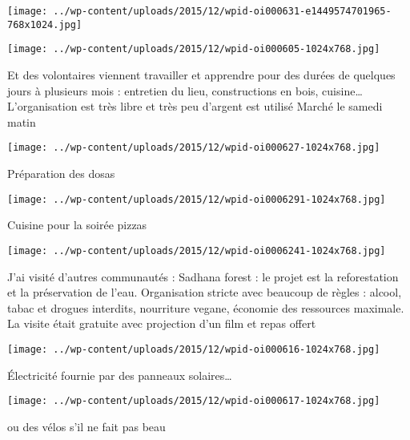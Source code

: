  \newline
\centerline{\texttt{[image: ../wp-content/uploads/2015/12/wpid-oi000631-e1449574701965-768x1024.jpg]} } 
 \newline
 \newline
\centerline{\texttt{[image: ../wp-content/uploads/2015/12/wpid-oi000605-1024x768.jpg]} } 
 \newline
 Et des volontaires viennent travailler et apprendre pour des durées de quelques jours à plusieurs mois : entretien du lieu, constructions en bois, cuisine… L'organisation est très libre et très peu d'argent est utilisé \newline
 Marché le samedi matin \newline
 \newline
\centerline{\texttt{[image: ../wp-content/uploads/2015/12/wpid-oi000627-1024x768.jpg]} } 
 \newline
 Préparation des dosas \newline
 \newline
\centerline{\texttt{[image: ../wp-content/uploads/2015/12/wpid-oi0006291-1024x768.jpg]} } 
 \newline
 Cuisine pour la soirée pizzas \newline
 \newline
\centerline{\texttt{[image: ../wp-content/uploads/2015/12/wpid-oi0006241-1024x768.jpg]} } 
 \newline
 J'ai visité d'autres communautés : \newline
 Sadhana forest : le projet est la reforestation et la préservation de l'eau. Organisation stricte avec beaucoup de règles : alcool, tabac et drogues interdits, nourriture vegane, économie des ressources maximale. La visite était gratuite avec projection d'un film et repas offert \newline
 \newline
\centerline{\texttt{[image: ../wp-content/uploads/2015/12/wpid-oi000616-1024x768.jpg]} } 
 \newline
 Électricité fournie par des panneaux solaires… \newline
 \newline
\centerline{\texttt{[image: ../wp-content/uploads/2015/12/wpid-oi000617-1024x768.jpg]} } 
 \newline
 ou des vélos s'il ne fait pas beau \newline
 \newline
